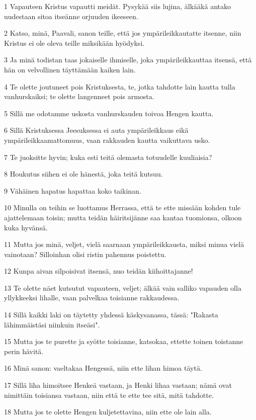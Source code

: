 \par 1 Vapauteen Kristus vapautti meidät. Pysykää siis lujina, älkääkä antako uudestaan sitoa itseänne orjuuden ikeeseen.
\par 2 Katso, minä, Paavali, sanon teille, että jos ympärileikkautatte itsenne, niin Kristus ei ole oleva teille miksikään hyödyksi.
\par 3 Ja minä todistan taas jokaiselle ihmiselle, joka ympärileikkauttaa itsensä, että hän on velvollinen täyttämään kaiken lain.
\par 4 Te olette joutuneet pois Kristuksesta, te, jotka tahdotte lain kautta tulla vanhurskaiksi; te olette langenneet pois armosta.
\par 5 Sillä me odotamme uskosta vanhurskauden toivoa Hengen kautta.
\par 6 Sillä Kristuksessa Jeesuksessa ei auta ympärileikkaus eikä ympärileikkaamattomuus, vaan rakkauden kautta vaikuttava usko.
\par 7 Te juoksitte hyvin; kuka esti teitä olemasta totuudelle kuuliaisia?
\par 8 Houkutus siihen ei ole hänestä, joka teitä kutsuu.
\par 9 Vähäinen hapatus hapattaa koko taikinan.
\par 10 Minulla on teihin se luottamus Herrassa, että te ette missään kohden tule ajattelemaan toisin; mutta teidän häiritsijänne saa kantaa tuomionsa, olkoon kuka hyvänsä.
\par 11 Mutta jos minä, veljet, vielä saarnaan ympärileikkausta, miksi minua vielä vainotaan? Silloinhan olisi ristin pahennus poistettu.
\par 12 Kunpa aivan silpoisivat itsensä, nuo teidän kiihoittajanne!
\par 13 Te olette näet kutsutut vapauteen, veljet; älkää vain salliko vapauden olla yllykkeeksi lihalle, vaan palvelkaa toisianne rakkaudessa.
\par 14 Sillä kaikki laki on täytetty yhdessä käskysanassa, tässä: "Rakasta lähimmäistäsi niinkuin itseäsi".
\par 15 Mutta jos te purette ja syötte toisianne, katsokaa, ettette toinen toistanne perin hävitä.
\par 16 Minä sanon: vaeltakaa Hengessä, niin ette lihan himoa täytä.
\par 17 Sillä liha himoitsee Henkeä vastaan, ja Henki lihaa vastaan; nämä ovat nimittäin toisiansa vastaan, niin että te ette tee sitä, mitä tahdotte.
\par 18 Mutta jos te olette Hengen kuljetettavina, niin ette ole lain alla.
